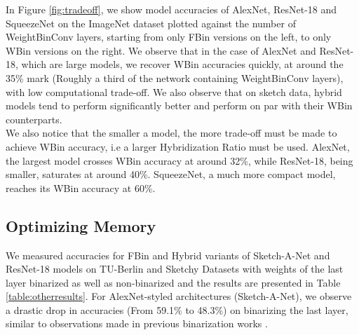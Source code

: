 \noindent In Figure \ref{fig:tradeoff}, we show model accuracies of AlexNet, ResNet-18 and SqueezeNet on the ImageNet dataset plotted against the number of WeightBinConv layers, starting from only FBin versions on the left, to only WBin versions on the right. We observe that in the case of AlexNet and ResNet-18, which are large models, we recover WBin accuracies quickly, at around the 35\% mark (Roughly a third of the network containing WeightBinConv layers), with low computational trade-off. We also observe that on sketch data, hybrid models tend to perform significantly better and perform on par with their WBin counterparts.\\ 

\noindent We also notice that the smaller a model, the more trade-off must be made to achieve WBin accuracy, i.e a larger Hybridization Ratio must be used. AlexNet, the largest model crosses WBin accuracy at around 32\%, while ResNet-18, being smaller, saturates at around 40\%. SqueezeNet, a much more compact model, reaches its WBin accuracy at 60\%.

\subsection{Optimizing Memory}
\noindent We measured accuracies for FBin and Hybrid variants of Sketch-A-Net and ResNet-18 models on TU-Berlin and Sketchy Datasets with weights of the last layer binarized as well as non-binarized and the results are presented in Table \ref{table:otherresults}. For AlexNet-styled architectures (Sketch-A-Net), we observe a drastic drop in accuracies (From 59.1\% to 48.3\%) on binarizing the last layer, similar to observations made in previous binarization works \cite{zhou2016dorefa,tang2017train}. \\

